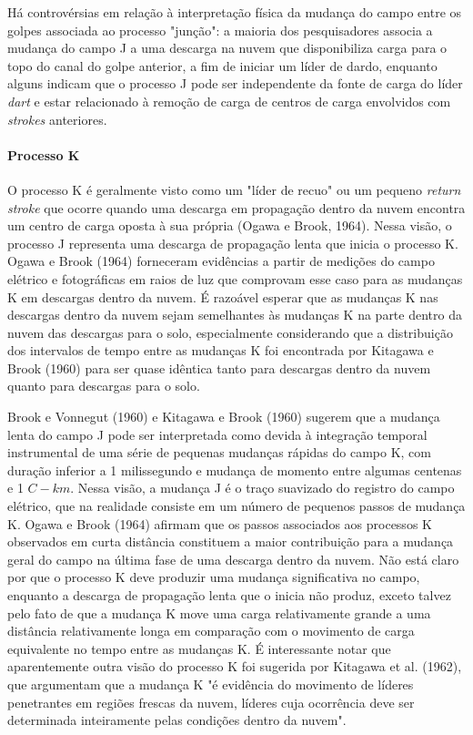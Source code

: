 \documentclass[a4paper, 12pt, onecolumn,singlespacing]{article}
\begin{document}
		Há controvérsias em relação à interpretação física da mudança do campo entre os golpes associada ao processo "junção": a maioria dos pesquisadores associa a mudança do campo J a uma descarga na nuvem que disponibiliza carga para o topo do canal do golpe anterior, a fim de iniciar um líder de dardo, enquanto alguns indicam que o processo J pode ser independente da fonte de carga do líder \textit{dart} e estar relacionado à remoção de carga de centros de carga envolvidos com \textit{strokes} anteriores.
		
		
		\paragraph{Processo K}
		
		O processo K \cite{UHMAN_1987} é geralmente visto como um "líder de recuo" ou um pequeno \textit{return stroke} que ocorre quando uma descarga em propagação dentro da nuvem encontra um centro de carga oposta à sua própria (Ogawa e Brook, 1964). Nessa visão, o processo J representa uma descarga de propagação lenta que inicia o processo K. Ogawa e Brook (1964) forneceram evidências a partir de medições do campo elétrico e fotográficas em raios de luz que comprovam esse caso para as mudanças K em descargas dentro da nuvem. É razoável esperar que as mudanças K nas descargas dentro da nuvem sejam semelhantes às mudanças K na parte dentro da nuvem das descargas para o solo, especialmente considerando que a distribuição dos intervalos de tempo entre as mudanças K foi encontrada por Kitagawa e Brook (1960) para ser quase idêntica tanto para descargas dentro da nuvem quanto para descargas para o solo.
		
		Brook e Vonnegut (1960) e Kitagawa e Brook (1960) sugerem que a mudança lenta do campo J pode ser interpretada como devida à integração temporal instrumental de uma série de pequenas mudanças rápidas do campo K, com duração inferior a 1 milissegundo e mudança de momento entre algumas centenas e 1 $C-km$. Nessa visão, a mudança J é o traço suavizado do registro do campo elétrico, que na realidade consiste em um número de pequenos passos de mudança K. Ogawa e Brook (1964) afirmam que os passos associados aos processos K observados em curta distância constituem a maior contribuição para a mudança geral do campo na última fase de uma descarga dentro da nuvem. Não está claro por que o processo K deve produzir uma mudança significativa no campo, enquanto a descarga de propagação lenta que o inicia não produz, exceto talvez pelo fato de que a mudança K move uma carga relativamente grande a uma distância relativamente longa em comparação com o movimento de carga equivalente no tempo entre as mudanças K. É interessante notar que aparentemente outra visão do processo K foi sugerida por Kitagawa et al. (1962), que argumentam que a mudança K "é evidência do movimento de líderes penetrantes em regiões frescas da nuvem, líderes cuja ocorrência deve ser determinada inteiramente pelas condições dentro da nuvem".
		
\end{document}
